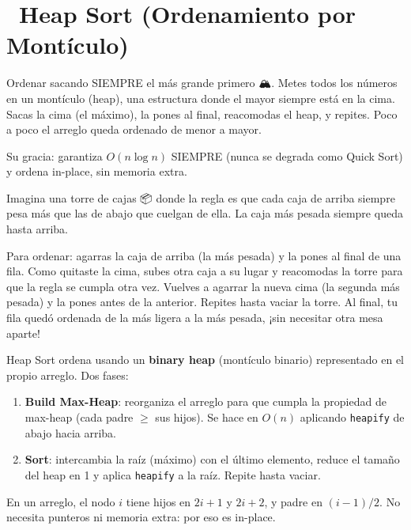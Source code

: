 \chapter[\emj{⛰️}~Heap Sort (Ordenamiento por Montículo)]{~Heap Sort (Ordenamiento por Montículo)}

\begin{dsaquees}

Ordenar sacando SIEMPRE el más grande primero 🏔️. Metes todos los números
en un montículo (heap), una estructura donde el mayor siempre está en la
cima. Sacas la cima (el máximo), la pones al final, reacomodas el heap, y
repites. Poco a poco el arreglo queda ordenado de menor a mayor.

Su gracia: garantiza $O(n \log n)$ SIEMPRE (nunca se degrada como Quick
Sort) y ordena in-place, sin memoria extra.

\end{dsaquees}

\begin{dsanino}

Imagina una torre de cajas 📦 donde la regla es que cada caja de arriba
siempre pesa más que las de abajo que cuelgan de ella. La caja más pesada
siempre queda hasta arriba.

Para ordenar: agarras la caja de arriba (la más pesada) y la pones al
final de una fila. Como quitaste la cima, subes otra caja a su lugar y
reacomodas la torre para que la regla se cumpla otra vez. Vuelves a
agarrar la nueva cima (la segunda más pesada) y la pones antes de la
anterior. Repites hasta vaciar la torre. Al final, tu fila quedó ordenada
de la más ligera a la más pesada, ¡sin necesitar otra mesa aparte!

\end{dsanino}

\begin{dsaotraforma}

Heap Sort ordena usando un \textbf{binary heap} (montículo binario)
representado en el propio arreglo. Dos fases:

\begin{enumerate}
\item \textbf{Build Max-Heap}: reorganiza el arreglo para que cumpla la
      propiedad de max-heap (cada padre $\ge$ sus hijos). Se hace en
      $O(n)$ aplicando \verb|heapify| de abajo hacia arriba.
\item \textbf{Sort}: intercambia la raíz (máximo) con el último elemento,
      reduce el tamaño del heap en 1 y aplica \verb|heapify| a la raíz.
      Repite hasta vaciar.
\end{enumerate}

En un arreglo, el nodo $i$ tiene hijos en $2i+1$ y $2i+2$, y padre en
$(i-1)/2$. No necesita punteros ni memoria extra: por eso es in-place.

\end{dsaotraforma}

